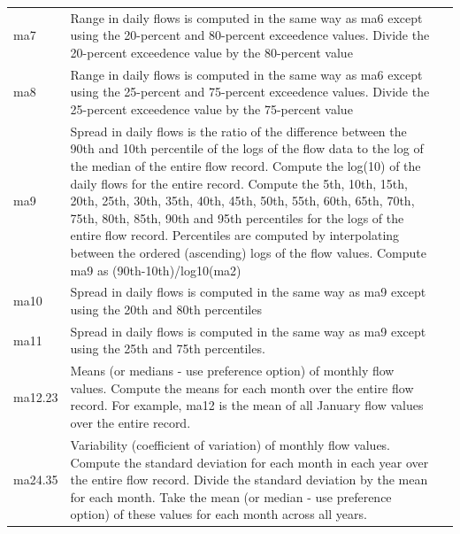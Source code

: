 \documentclass[a4paper,11pt]{article}\usepackage[]{graphicx}\usepackage[]{color}
\begin{document}
\begin{table}[ht]
\begin{threeparttable}[b]
\begin{tabularx}{\textwidth}{lXl}
  ma7 & Range in daily flows is computed in the same way as ma6 except using the 20-percent and 80-percent exceedence values. Divide the 20-percent exceedence value by the 80-percent value \\
  ma8 & Range in daily flows is computed in the same way as ma6 except using the 25-percent and 75-percent exceedence values. Divide the 25-percent exceedence value by the 75-percent value \\
  ma9 & Spread in daily flows is the ratio of the difference between the 90th and 10th percentile of the logs of the flow data to the log of the median of the entire flow record. Compute the log(10) of the daily flows for the entire record. Compute the 5th, 10th, 15th, 20th, 25th, 30th, 35th, 40th, 45th, 50th, 55th, 60th, 65th, 70th, 75th, 80th, 85th, 90th and 95th percentiles for the logs of the entire flow record. Percentiles are computed by interpolating between the ordered (ascending) logs of the flow values. Compute ma9 as (90th-10th)/log10(ma2) \\
  ma10 & Spread in daily flows is computed in the same way as ma9 except using the 20th and 80th percentiles \\
  ma11 & Spread in daily flows is computed in the same way as ma9 except using the 25th and 75th percentiles. \\
  ma12.23 & Means (or medians - use preference option) of monthly flow values. Compute the means for each month over the entire flow record. For example, ma12 is the mean of all January flow values over the entire record. \\
  ma24.35 & Variability (coefficient of variation) of monthly flow values. Compute the standard deviation for each month in each year over the entire flow record. Divide the standard deviation by the mean for each month. Take the mean (or median - use preference option) of these values for each month across all years. \\
  \hline
  \end{tabularx}
  \end{threeparttable}
\end{table}
\end{document}
